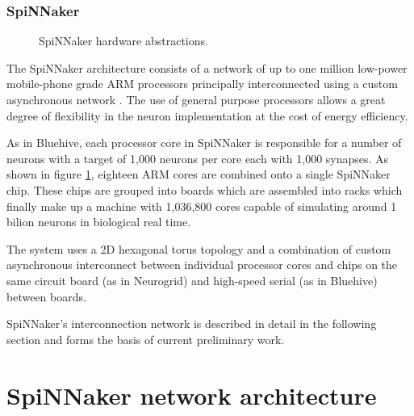 			
			\subsubsection{SpiNNaker}
				
				
				\begin{figure}
					
					
					\caption{SpiNNaker hardware abstractions.}
					\label{fig:spinnaker-abstractions}
				\end{figure}
				
				The SpiNNaker architecture consists of a network of up to one million
				low-power mobile-phone grade ARM processors principally interconnected
				using a custom asynchronous network \cite{furber06}. The use of general
				purpose processors allows a great degree of flexibility in the neuron
				implementation at the cost of energy efficiency.
				
				As in Bluehive, each processor core in SpiNNaker is responsible for a
				number of neurons with a target of 1,000 neurons per core each with
				1,000 synapses. As shown in figure \ref{fig:spinnaker-abstractions},
				eighteen ARM cores are combined onto a single SpiNNaker chip. These
				chips are grouped into boards which are assembled into racks which
				finally make up a machine with 1,036,800 cores capable of simulating
				around 1 bilion neurons in biological real time.
				
				The system uses a 2D hexagonal torus topology and a combination of
				custom asynchronous interconnect between individual processor cores and
				chips on the same circuit board (as in Neurogrid) and high-speed serial
				(as in Bluehive) between boards.
				
				SpiNNaker's interconnection network is described in detail in the
				following section and forms the basis of current preliminary work.
	
	\section{SpiNNaker network architecture}
		\label{sec:spinnaker}
		
		
